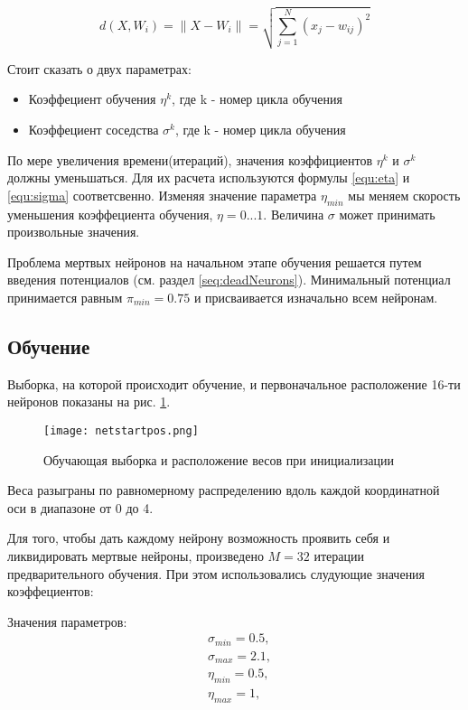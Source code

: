 \begin{equation}\label{equ:euclid}
    d \left( X , W _ { i } \right) = \left\| X - W _ { i } \right\| = \sqrt { \sum _ { j = 1 } ^ { N } \left( x _ { j } - w _ { i j } \right) ^ { 2 } }
\end{equation}

Стоит сказать о двух параметрах:
\begin{itemize}
    \item Коэффециент обучения $\eta^k$, где k - номер цикла обучения
    \item Коэффециент соседства $\sigma^k$, где k - номер цикла обучения
\end{itemize}

По мере увеличения времени(итераций), значения коэффициентов $\eta ^ { k }$ и $\sigma ^ { k }$ должны уменьшаться. Для их расчета используются формулы \ref{equ:eta} и \ref{equ:sigma} соответсвенно. Изменяя значение параметра $\eta_{min}$ мы меняем скорость уменьшения коэффециента обучения, $\eta = 0 ... 1$. Величина $\sigma$ может принимать произвольные значения.


Проблема мертвых нейронов на начальном этапе обучения решается путем введения потенциалов (см. раздел \ref{seq:deadNeurons}). 
Минимальный потенциал принимается равным $\pi_{min} = 0.75$ и присваивается изначально всем нейронам.



\subsection{Обучение}
Выборка, на которой происходит обучение, и первоначальное расположение 16-ти нейронов показаны на рис. \ref{img:startpos}.

\begin{figure}[H]
\centering
\texttt{[image: netstartpos.png]}
\caption{Обучающая выборка и расположение весов при инициализации}
\label{img:startpos}
\end{figure}

Веса разыграны по равномерному распределению вдоль каждой координатной оси в диапазоне от 0 до 4.

Для того, чтобы дать каждому нейрону возможность проявить себя и ликвидировать мертвые нейроны, произведено $M = 32$ итерации предварительного обучения. При этом использовались слудующие значения коэффециентов:

Значения параметров:
\begin{equation}
	\begin{aligned}
	 &	\sigma_{min} = 0.5,  \\ 
	 &	\sigma_{max} = 2.1, \\	
	 &	\eta_{min} = 0.5,  \\ 
	 &	\eta_{max} = 1, \\
	\end{aligned}
\end{equation} 

